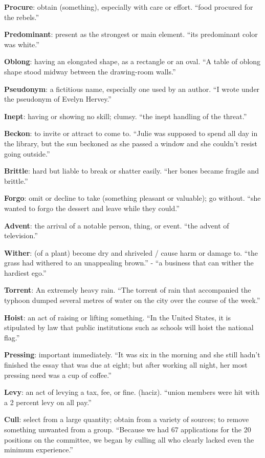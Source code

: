 \documentclass[12pt, a4paper]{ximera}
\begin{document}
\textbf{Procure}: obtain (something), especially with care or effort. ``food procured for the rebels.''

\textbf{Predominant}: present as the strongest or main element. ``its predominant color was white.''

\textbf{Oblong}: having an elongated shape, as a rectangle or an oval. ``A table of oblong shape stood midway between the drawing-room walls.''

\textbf{Pseudonym}: a fictitious name, especially one used by an author. ``I wrote under the pseudonym of Evelyn Hervey.''

\textbf{Inept}: having or showing no skill; clumsy. ``the inept handling of the threat.''

\textbf{Beckon}: to invite or attract to come to. ``Julie was supposed to spend all day in the library, but the sun beckoned as she passed a window and she couldn't resist going outside.''

\textbf{Brittle}: hard but liable to break or shatter easily. ``her bones became fragile and brittle.''

\textbf{Forgo}: omit or decline to take (something pleasant or valuable); go without. ``she wanted to forgo the dessert and leave while they could.''

\textbf{Advent}: the arrival of a notable person, thing, or event. ``the advent of television.''

\textbf{Wither}: (of a plant) become dry and shriveled / cause harm or damage to. ``the grass had withered to an unappealing brown.'' - ``a business that can wither the hardiest ego.''

\textbf{Torrent}: An extremely heavy rain. ``The torrent of rain that accompanied the typhoon dumped several metres of water on the city over the course of the week.''

\textbf{Hoist}: an act of raising or lifting something. ``In the United States, it is stipulated by law that public institutions such as schools will hoist the national flag.''

\textbf{Pressing}: important immediately. ``It was six in the morning and she still hadn't finished the essay that was due at eight; but after working all night, her most pressing need was a cup of coffee.''

\textbf{Levy}: an act of levying a tax, fee, or fine. (haciz). ``union members were hit with a 2 percent levy on all pay.''

\textbf{Cull}: select from a large quantity; obtain from a variety of sources; to remove something unwanted from a group. ``Because we had 67 applications for the 20 positions on the committee, we began by culling all who clearly lacked even the minimum experience.''
\end{document}
